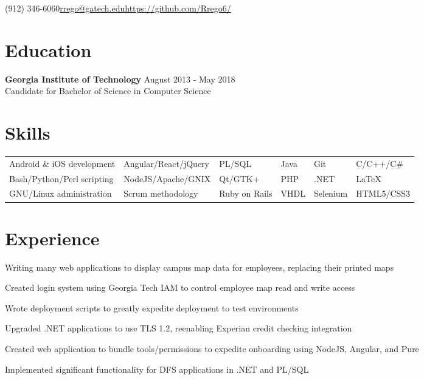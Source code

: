 \documentclass[line]{resume}
\begin{document}
\begin{center}
 {(912) 346-6060}{\href{mailto:rrego@gatech.edu}{rrego@gatech.edu}}{\href{https://github.com/Rrego6/}{https://github.com/Rrego6/}}
\end{center}
\section{Education}
\textbf{Georgia Institute of Technology} \hfill August 2013 - May 2018  \\
Candidate for Bachelor of Science in Computer Science
\section{Skills}
\begin{tabular}{l l l l l l}
	Android \& iOS development & Angular/React/jQuery & PL/SQL & Java  & Git & C/C++/C\# \\
	Bash/Python/Perl scripting & NodeJS/Apache/GNIX  & Qt/GTK+ & PHP &  .NET & LaTeX \\
	GNU/Linux administration & Scrum methodology & Ruby on Rails & VHDL & Selenium  & HTML5/CSS3
\end{tabular}
\section{Experience}
\begin{myitemize}
	\item Writing many web applications to display campus map data for employees, replacing their printed maps
	\item Created login system using Georgia Tech IAM to control employee map read and write access 
\end{myitemize}

\begin{myitemize}
	\item Wrote deployment scripts to greatly expedite deployment to test environments
	\item Upgraded .NET applications to use TLS 1.2, reenabling Experian credit checking integration
	\item Created web application to bundle tools/permissions to expedite onboarding using NodeJS, Angular, and Pure
	\item Implemented significant functionality for DFS applications in .NET and PL/SQL 
\end{myitemize}
\end{document}
